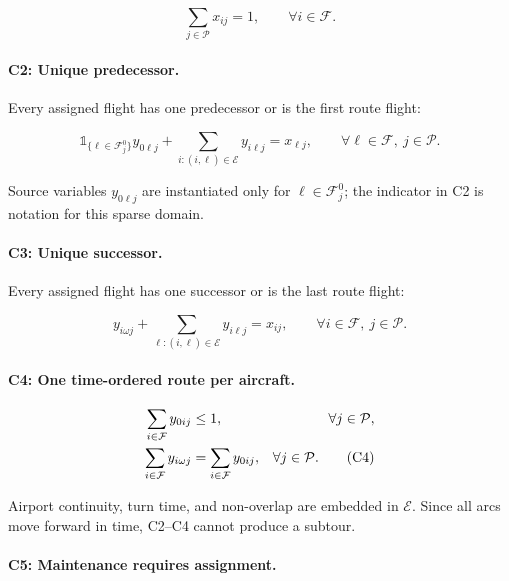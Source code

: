 \documentclass[11pt,a4paper]{article}
\newcommand{\F}{\mathcal{F}}
\newcommand{\Pset}{\mathcal{P}}
\newcommand{\Eset}{\mathcal{E}}
\begin{document}
\begin{equation}
  \sum_{j\in\Pset}x_{ij}=1,
  \qquad \forall i\in\F.
  \tag{C1}\label{eq:event_c1}
\end{equation}

\paragraph{C2: Unique predecessor.}
Every assigned flight has one predecessor or is the first route flight:

\begin{equation}
  \mathbb{1}_{\{\ell\in\F^0_j\}}y_{0\ell j}
  +\sum_{i:(i,\ell)\in\Eset}y_{i\ell j}=x_{\ell j},
  \qquad \forall \ell\in\F,\ j\in\Pset.
  \tag{C2}\label{eq:event_c2}
\end{equation}

Source variables $y_{0\ell j}$ are instantiated only for
$\ell\in\F^0_j$; the indicator in C2 is notation for this sparse domain.

\paragraph{C3: Unique successor.}
Every assigned flight has one successor or is the last route flight:

\begin{equation}
  y_{i\omega j}+\sum_{\ell:(i,\ell)\in\Eset}y_{i\ell j}=x_{ij},
  \qquad \forall i\in\F,\ j\in\Pset.
  \tag{C3}\label{eq:event_c3}
\end{equation}

\paragraph{C4: One time-ordered route per aircraft.}

\begin{align}
  \sum_{i\in\F}y_{0ij}&\leq1,
  &\forall j\in\Pset,\notag\\
  \sum_{i\in\F}y_{i\omega j}&=\sum_{i\in\F}y_{0ij},
  &\forall j\in\Pset.
  \tag{C4}\label{eq:event_c4}
\end{align}

Airport continuity, turn time, and non-overlap are embedded in $\Eset$. Since
all arcs move forward in time, C2--C4 cannot produce a subtour.

\paragraph{C5: Maintenance requires assignment.}
\end{document}
